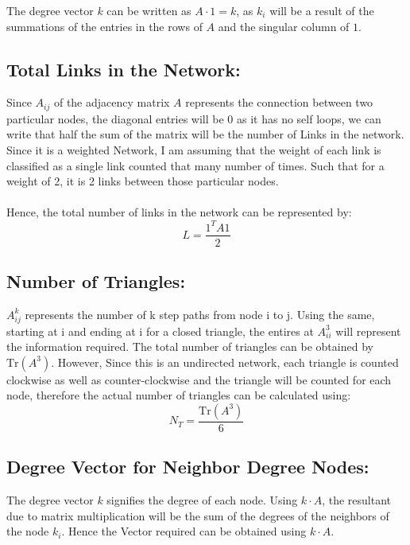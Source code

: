 \documentclass[11pt]{article}
\begin{document}
The degree vector $k$ can be written as $A \cdot 1 = k$, as $k_i$ will be a result of the summations of the entries in the rows of $A$ and the singular column of $1$.

\subsection{Total Links in the Network:}

Since $A_{ij}$ of the adjacency matrix $A$ represents the connection between two particular nodes, the diagonal entries will be $0$ as it has no self loops, we can write that half the sum of the matrix will be the number of Links in the network. Since it is a weighted Network, I am assuming that the weight of each link is classified as a single link counted that many number of times. Such that for a weight of 2, it is 2 links between those particular nodes.
\\ \\
Hence, the total number of links in the network can be represented by:
\begin{equation}
    L = \frac{1^T A 1}{2}
\end{equation}

\subsection{Number of Triangles:}
$A_{ij}^k$ represents the number of k step paths from node i to j. Using the same, starting at i and ending at i for a closed triangle, the entires at $A_{ii}^3$ will represent the information required. The total number of triangles can be obtained by $\text{Tr}(A^3)$. However, Since this is an undirected network, each triangle is counted clockwise as well as counter-clockwise and the triangle will be counted for each node, therefore the actual number of triangles can be calculated using:
\begin{equation}
    N_T = \frac{\text{Tr}(A^3)}{6}
\end{equation}

\subsection{Degree Vector for Neighbor Degree Nodes:}

The degree vector $k$ signifies the degree of each node. Using $k\cdot A$, the resultant due to matrix multiplication will be the sum of the degrees of the neighbors of the node $k_i$. Hence the Vector required can be obtained using $ k \cdot A$.
\end{document}
